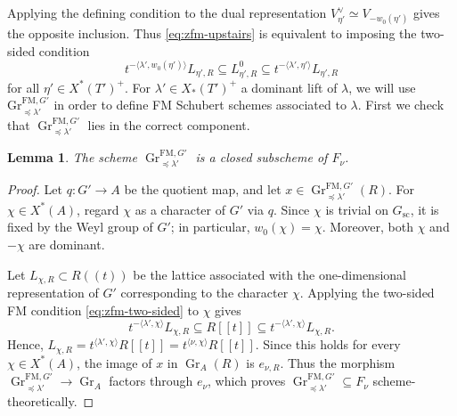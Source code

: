 \documentclass[a4paper, 12pt]{amsart}
\newtheorem{lemma}[theorem]{Lemma}
\theoremstyle{definition}
\DeclareMathOperator{\Gr}{\mathrm{Gr}}
\begin{document}
Applying the defining condition to the dual representation
$V_{\eta'}^\vee\simeq V_{-w_0(\eta')}$ gives the opposite inclusion. Thus
\eqref{eq:zfm-upstairs} is equivalent to imposing the two-sided condition
\begin{equation}\label{eq:zfm-two-sided}
t^{-\langle\lambda',w_0(\eta')\rangle}L_{\eta',R}
\subseteq L^0_{\eta',R}
\subseteq t^{-\langle\lambda',\eta'\rangle}L_{\eta',R}
\end{equation}
for all $\eta' \in X^*(T')^+$.
For $\lambda' \in X_*(T')^+$ a dominant lift of $\lambda$, we will use $\mathrm{Gr}_{\preceq \lambda'}^{\mathrm{FM}, G'}$ in order to define FM Schubert schemes associated to $\lambda$. First we check that $\Gr_{\preceq \lambda'}^{\mathrm{FM}, G'}$ lies in the correct component.

\begin{lemma}\label{lem:zfm-fiber}
The scheme $\Gr^{\mathrm{FM},G'}_{\preceq\lambda'}$ is a closed subscheme of $F_\nu$. 
\end{lemma}
\begin{proof}
Let $q:G'\to A$ be the quotient map, and let
$x\in\Gr_{\preceq\lambda'}^{\mathrm{FM},G'}(R)$.
For $\chi\in X^*(A)$, regard $\chi$ as a character of $G'$ via $q$.
Since $\chi$ is trivial on $G_{\mathrm{sc}}$, it is fixed by the Weyl
group of $G'$; in particular, $w_0(\chi)=\chi$.
Moreover, both $\chi$ and $-\chi$ are dominant.

Let $L_{\chi,R}\subset R((t))$ be the lattice associated with the
one-dimensional representation of $G'$ corresponding to the character $\chi$. Applying the
two-sided FM condition \eqref{eq:zfm-two-sided} to $\chi$ gives
\[
t^{-\langle\lambda',\chi\rangle}L_{\chi,R}
\subseteq R[[t]]
\subseteq
t^{-\langle\lambda',\chi\rangle}L_{\chi,R}.
\]
Hence, 
$L_{\chi,R} = t^{\langle\lambda',\chi\rangle}R[[t]] = t^{\langle\nu,\chi\rangle}R[[t]]$.  Since this holds for every $\chi\in X^*(A)$, the image of $x$ in
$\Gr_A(R)$ is $e_{\nu,R}$. Thus the morphism  $\Gr_{\preceq\lambda'}^{\mathrm{FM},G'}\to \Gr_A$
factors through $e_\nu$, which proves  $\Gr_{\preceq\lambda'}^{\mathrm{FM},G'}\subseteq F_\nu$ scheme-theoretically.
\end{proof}
%
\end{document}
